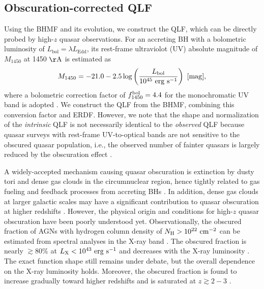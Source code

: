 \documentclass[twocolumn, twocolappendix]{aastex63}
\newcommand{\Muv}{M_{1450}}
\newcommand{\Lbol}{L_\mathrm{bol}}
\begin{document}
\begin{CJK*}{UTF8}{gbsn}
\vspace{2mm}
\subsection{Obscuration-corrected QLF}\label{sec:LF}

Using the BHMF and its evolution, we construct the QLF, which can be directly probed by high-$z$ quasar observations.
For an accreting BH with a bolometric luminosity of $\Lbol=\lambda L_\mathrm{Edd}$, 
its rest-frame ultraviolot (UV) absolute magnitude of $\Muv$ at 1450 $\mathrm{\AA}$ is estimated as
%
\begin{equation}
  \label{eq:M1450}
  \Muv= -21.0-2.5 \log  \left(\frac{\Lbol}{10^{45}~\mathrm{erg~s}^{-1}} \right) ~[\rm{mag}],
\end{equation}
%
where a bolometric correction factor of $f^{\rm bol}_{1450}=4.4$ for the monochromatic UV band is adopted
\citep{2006ApJS..166..470R}.
We construct the QLF from the BHMF, combining this conversion factor and ERDF.
However, we note that the shape and normalization of the {\it intrinsic} QLF is not necessarily identical to the {\it observed} QLF
because quasar surveys with rest-frame UV-to-optical bands are not sensitive to the obscured quasar population,
i.e., the observed number of fainter quasars is largely reduced by the obscuration effect
\citep{2003ApJ...598..886U,2007A&A...463...79G,2008A&A...490..905H,2014ApJ...786..104U,2014MNRAS.437.3550M}. 


A widely-accepted mechanism causing quasar obscuration is extinction by dusty tori and dense gas clouds 
in the circumnuclear region, hence tightly related to gas fueling and feedback processes from accreting BHs 
\citep[see][for a review]{2018ARA&A..56..625H}.
In addition, dense gas clouds at larger galactic scales may have a significant contribution to quasar obscuration at 
higher redshifts \citep{2020MNRAS.495.2135N}.
However, the physical origin and conditions for high-$z$ quasar obscuration have been poorly understood yet.
Observationally, the obscured fraction of AGNs with hydrogen column density of $N_{\rm H}>10^{22}~{\rm cm}^{-2}$
can be estimated from spectral analyses in the X-ray band
\citep[e.g.,][]{2003ApJ...598..886U,2007A&A...463...79G,2008A&A...490..905H}. 
The obscured fraction is nearly $\gtrsim 80\%$ at $L_{\rm X}<10^{43}~{\rm erg~s}^{-1}$ and 
decreases with the X-ray luminosity \citep{2014ApJ...786..104U,2014MNRAS.437.3550M}.
The exact function shape still remains under debate, but the overall dependence on the X-ray luminosity holds.
Moreover, the obscured fraction is found to increase gradually toward higher redshifts and is saturated at $z\gtrsim 2-3$
\citep{2008A&A...490..905H,2014ApJ...786..104U,2014MNRAS.437.3550M,2018MNRAS.473.2378V,2022arXiv220603508G}.



\end{CJK*}
\end{document}
